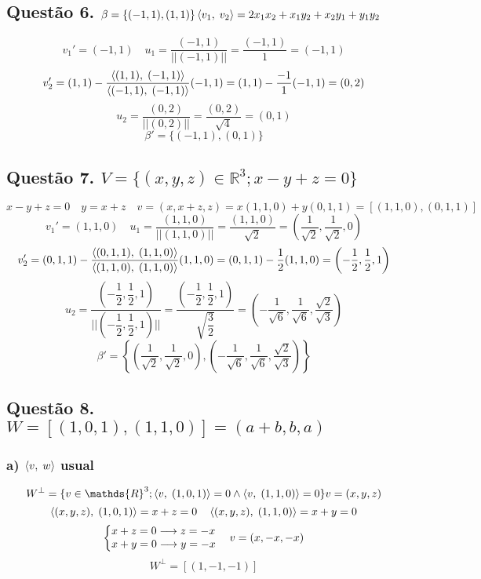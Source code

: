 \documentclass[12pt]{article}
\begin{document}
\subsection{Questão 6. $\beta = \lbrace (-1,1), (1,1) \rbrace \hfill \p{v_{1}}{v_{2}} = 2x_{1}x_{2}+x_{1}y_{2}+x_{2}y_{1}+y_{1}y_{2}$}

\[v_{1}' = (-1,1) \quad u_{1} = \dfrac{(-1,1)}{||(-1,1)||} = \dfrac{(-1,1)}{1} = (-1,1)\]
\[v_{2}' = (1,1) - \dfrac{\left\langle(1,1),\;(-1,1)\right\rangle}{\left\langle(-1,1),\;(-1,1)\right\rangle}(-1,1) = (1,1) - \dfrac{-1}{1}(-1,1) = (0,2)\]
\[u_{2} = \dfrac{(0,2)}{||(0,2)||} = \dfrac{(0,2)}{\sqrt{4}} = (0,1)\]
\[\beta' = \lbrace (-1,1), (0,1) \rbrace\]

\subsection{Questão 7. $V = \lbrace (x,y,z) \in \mathds{R}^{3}; x-y+z=0 \rbrace$}

\[x-y+z=0 \quad y = x+z \quad v = (x, x+z, z) = x(1,1,0) + y(0,1,1) = [(1,1,0),(0,1,1)]\]
\[v_{1}' = (1,1,0) \quad u_{1} = \dfrac{(1,1,0)}{||(1,1,0)||} = \dfrac{(1,1,0)}{\sqrt{2}} = \left( \dfrac{1}{\sqrt{2}}, \dfrac{1}{\sqrt{2}}, 0 \right)\]
\[v_{2}' = (0,1,1) - \dfrac{\left\langle(0,1,1),\;(1,1,0)\right\rangle}{\left\langle(1,1,0),\;(1,1,0)\right\rangle}(1,1,0) = (0,1,1) - \dfrac{1}{2}(1,1,0) = \left(-\dfrac{1}{2}, \dfrac{1}{2}, 1\right)\]
\[u_{2} = \dfrac{\left(-\dfrac{1}{2}, \dfrac{1}{2}, 1\right)}{\biggr|\biggr|\left(-\dfrac{1}{2}, \dfrac{1}{2}, 1\right)\biggr|\biggr|} = \dfrac{\left(-\dfrac{1}{2}, \dfrac{1}{2}, 1\right)}{\sqrt{\dfrac{3}{2}}} = \left( -\dfrac{1}{\sqrt{6}}, \dfrac{1}{\sqrt{6}}, \dfrac{\sqrt{2}}{\sqrt{3}} \right)\]
\[\beta' = \left\lbrace \left( \dfrac{1}{\sqrt{2}}, \dfrac{1}{\sqrt{2}}, 0 \right), \left( -\dfrac{1}{\sqrt{6}}, \dfrac{1}{\sqrt{6}}, \dfrac{\sqrt{2}}{\sqrt{3}} \right) \right\rbrace\]

\subsection{Questão 8. $W = [(1,0,1),(1,1,0)] = (a+b,b,a)$}
\subsubsection{a) $\left\langle v,\;w\right\rangle$ usual}

\[W^{\perp} = \lbrace v \in \mathds{R}^{3}; \p{v}{(1,0,1)} = 0 \wedge \p{v}{(1,1,0)} = 0 \rbrace \hfill v = (x,y,z)\]
\[\left\langle(x,y,z),\;(1,0,1)\right\rangle = x+z = 0 \quad \left\langle(x,y,z),\;(1,1,0)\right\rangle = x+y = 0\]
\[\left\{ \begin{array}{@{}l@{}} x+z=0 \longrightarrow z=-x \\ x+y=0 \longrightarrow y=-x \end{array} \right. \quad v = (x,-x,-x)\]
\[W^{\perp} = [(1,-1,-1)]\]
\end{document}
